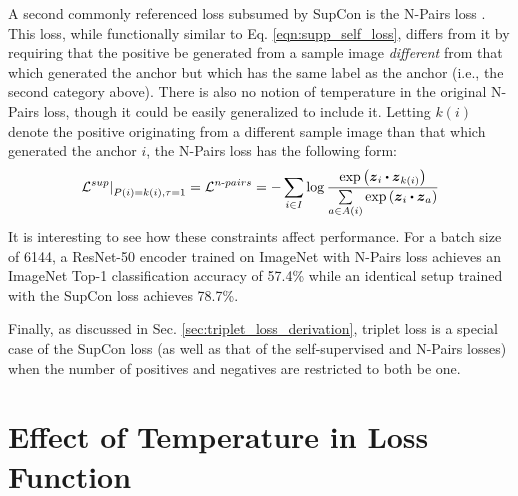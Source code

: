 A second commonly referenced loss subsumed by SupCon is the N-Pairs loss \cite{sohn2016improved}. This loss, while functionally similar to Eq. \ref{eqn:supp_self_loss}, differs from it by requiring that the positive be generated from a sample image \emph{different} from that which generated the anchor but which has the same label as the anchor (i.e., the second category above). There is also no notion of temperature in the original N-Pairs loss, though it could be easily generalized to include it. Letting $k(i)$ denote the positive originating from a different sample image than that which generated the anchor $i$, the N-Pairs loss has the following form:
\begin{equation}
  \left.\mathcal{L}^{sup}\right|_{P(i)=k(i),\tau=1}
  =\mathcal{L}^{n{\text -}pairs}
  =-\sum_{i\in I}\log{
  \frac{\text{exp}\left(\boldsymbol{z}_i\bigcdot\boldsymbol{z}_{k(i)}\right)}{\sum\limits_{a\in A(i)}\text{exp}\left(\boldsymbol{z}_i\bigcdot\boldsymbol{z}_a\right)}
  }
  \label{eqn:supp_npairs_loss}
\end{equation}
It is interesting to see how these constraints affect performance. For a batch size of 6144, a ResNet-50 encoder trained on ImageNet with N-Pairs loss achieves an ImageNet Top-1 classification accuracy of 57.4\% while an identical setup trained with the SupCon loss achieves 78.7\%.

Finally, as discussed in Sec. \ref{sec:triplet_loss_derivation}, triplet loss is a special case of the SupCon loss (as well as that of the self-supervised and N-Pairs losses) when the number of positives and negatives are restricted to both be one.

\section{Effect of Temperature in Loss Function}


